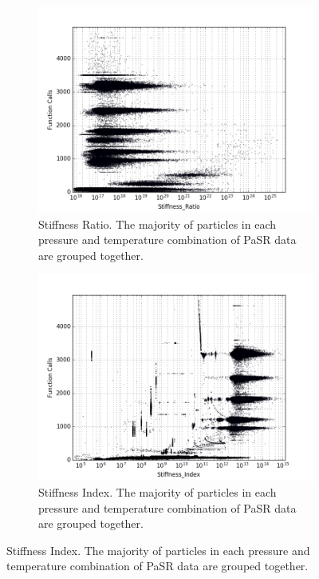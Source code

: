 \documentclass[12pt]{ussci}
\begin{document}
\begin{figure}[htbp]
    \centering
    \begin{subfigure}{0.43\textwidth}
        \includegraphics[width=\linewidth]{PaSR_Fn_Work_Stiffness_Ratio_1e-06_08_04.png}
        \caption{Stiffness Ratio.  The majority of particles in each pressure and temperature combination of PaSR data are grouped together.}
        \label{fig:SRH2COPaSR}
    \end{subfigure}
    \hfill
    \begin{subfigure}{0.43\textwidth}
        \includegraphics[width=\linewidth]{PaSR_Fn_Work_Stiffness_Index_1e-06_08_04.png}
        \caption{Stiffness Index. The majority of particles in each pressure and temperature combination of PaSR data are grouped together.}

\end{subfigure}
\end{figure}
\end{document}
